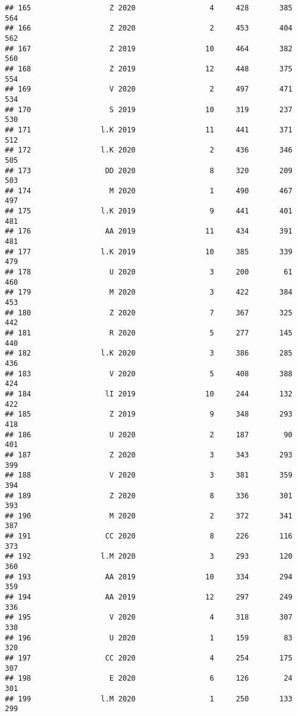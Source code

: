\documentclass[
]{article}
\begin{document}
\begin{verbatim}
## 165                  Z 2020                 4     428       385      564
## 166                  Z 2020                 2     453       404      562
## 167                  Z 2019                10     464       382      560
## 168                  Z 2019                12     448       375      554
## 169                  V 2020                 2     497       471      534
## 170                  S 2019                10     319       237      530
## 171                l.K 2019                11     441       371      512
## 172                l.K 2020                 2     436       346      505
## 173                 DD 2020                 8     320       209      503
## 174                  M 2020                 1     490       467      497
## 175                l.K 2019                 9     441       401      481
## 176                 AA 2019                11     434       391      481
## 177                l.K 2019                10     385       339      479
## 178                  U 2020                 3     200        61      460
## 179                  M 2020                 3     422       384      453
## 180                  Z 2020                 7     367       325      442
## 181                  R 2020                 5     277       145      440
## 182                l.K 2020                 3     386       285      436
## 183                  V 2020                 5     408       388      424
## 184                 lI 2019                10     244       132      422
## 185                  Z 2019                 9     348       293      418
## 186                  U 2020                 2     187        90      401
## 187                  Z 2020                 3     343       293      399
## 188                  V 2020                 3     381       359      394
## 189                  Z 2020                 8     336       301      393
## 190                  M 2020                 2     372       341      387
## 191                 CC 2020                 8     226       116      373
## 192                l.M 2020                 3     293       120      360
## 193                 AA 2019                10     334       294      359
## 194                 AA 2019                12     297       249      336
## 195                  V 2020                 4     318       307      330
## 196                  U 2020                 1     159        83      320
## 197                 CC 2020                 4     254       175      307
## 198                  E 2020                 6     126        24      301
## 199                l.M 2020                 1     250       133      299

\end{verbatim}
\end{document}
